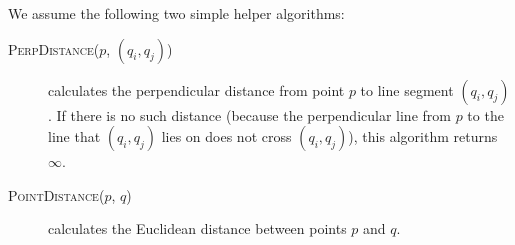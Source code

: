 We assume the following two simple helper algorithms:

\begin{description}
	\item[\textsc{PerpDistance}($p$, $(q_i, q_j)$)] calculates the perpendicular distance from point $p$ to line segment $(q_i, q_j)$.
		If there is no such distance (because the perpendicular line from $p$ to the line that $(q_i, q_j)$ lies on does not cross $(q_i, q_j)$), this algorithm returns $\infty$.
	\item[\textsc{PointDistance}($p$, $q$)] calculates the Euclidean distance between points $p$ and $q$.
\end{description}

\begin{sourcecode}
\qend
\end{sourcecode}
